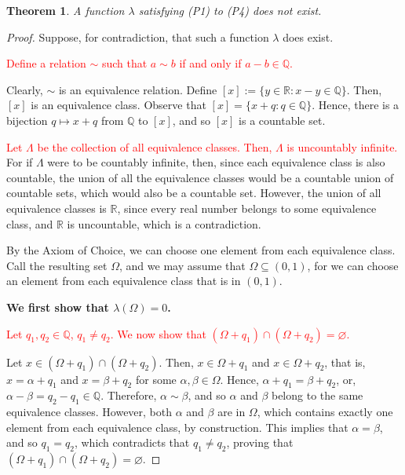 \documentclass[12pt]{extarticle}
\newcommand{\R}{\mathbb{R}}
\newcommand{\Q}{\mathbb{Q}}
\newcommand{\sub}{\subseteq}
\newtheorem*{theorem}{Theorem}
\begin{document}

\begin{theorem}
    A function $\lambda$ satisfying (P1) to (P4) does not exist.
\end{theorem}

\begin{proof}
Suppose, for contradiction, that such a function $\lambda$ does exist.

\textcolor{red}{Define a relation $\sim$ such that $a \sim b$ if and only if $a - b \in \Q$.}

Clearly, $\sim$ is an equivalence relation. Define $[x] := \{ y \in \R : x - y \in \Q \}$. Then, $[x]$ is an equivalence class. Observe that $[x] = \{ x + q : q \in \Q \}$. Hence, there is a bijection $q \mapsto x + q$ from $\Q$ to $[x]$, and so $[x]$ is a countable set.

\textcolor{red}{Let $\Lambda$ be the collection of all equivalence classes. Then, $\Lambda$ is uncountably infinite.} For if $\Lambda$ were to be countably infinite, then, since each equivalence class is also countable, the union of all the equivalence classes would be a countable union of countable sets, which would also be a countable set. However, the union of all equivalence classes is $\R$, since every real number belongs to some equivalence class, and $\R$ is uncountable, which is a contradiction.

By the Axiom of Choice, we can choose one element from each equivalence class. Call the resulting set $\Omega$, and we may assume that $\Omega \sub  (0, 1)$, for we can choose an element from each equivalence class that is in $(0, 1)$. 

\textbf{We first show that $\lambda(\Omega) = 0$.}

\textcolor{red}{Let $q_1, q_2 \in \Q$, $q_1 \neq q_2$. We now show that $(\Omega + q_1) \cap (\Omega + q_2) = \varnothing$.}

Let $x \in (\Omega + q_1) \cap (\Omega + q_2)$. Then, $x \in \Omega + q_1$ and $x \in \Omega + q_2$, that is, $x = \alpha + q_1$ and $x = \beta + q_2$ for some $\alpha, \beta \in \Omega$. Hence, $\alpha + q_1 = \beta + q_2$, or, $\alpha - \beta = q_2 - q_1 \in \Q$. Therefore, $\alpha \sim \beta$, and so $\alpha$ and $\beta$ belong to the same equivalence classes. However, both $\alpha$ and $\beta$ are in $\Omega$, which contains exactly one element from each equivalence class, by construction. This implies that $\alpha = \beta$, and so $q_1 = q_2$, which contradicts that $q_1 \neq q_2$, proving that $(\Omega + q_1) \cap (\Omega + q_2) = \varnothing$. 


\end{proof}
\end{document}
